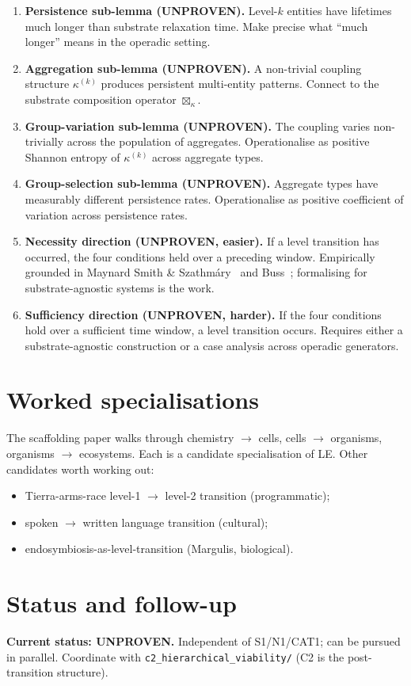 \documentclass[11pt]{article}
\theoremstyle{plain}
\theoremstyle{definition}
\begin{document}
\begin{enumerate}[leftmargin=2em,itemsep=4pt]
  \item \textbf{Persistence sub-lemma (UNPROVEN).} Level-$k$ entities
    have lifetimes much longer than substrate relaxation time. Make
    precise what ``much longer'' means in the operadic setting.
  \item \textbf{Aggregation sub-lemma (UNPROVEN).} A non-trivial
    coupling structure $\kappa^{(k)}$ produces persistent multi-entity
    patterns. Connect to the substrate composition operator
    $\boxtimes_\kappa$.
  \item \textbf{Group-variation sub-lemma (UNPROVEN).} The coupling
    varies non-trivially across the population of aggregates.
    Operationalise as positive Shannon entropy of $\kappa^{(k)}$
    across aggregate types.
  \item \textbf{Group-selection sub-lemma (UNPROVEN).} Aggregate
    types have measurably different persistence rates.
    Operationalise as positive coefficient of variation across
    persistence rates.
  \item \textbf{Necessity direction (UNPROVEN, easier).} If a level
    transition has occurred, the four conditions held over a
    preceding window. Empirically grounded in
    Maynard Smith \& Szathm\'ary~\cite{maynardsmith1995major} and
    Buss~\cite{buss1987evolution}; formalising for substrate-agnostic
    systems is the work.
  \item \textbf{Sufficiency direction (UNPROVEN, harder).} If the
    four conditions hold over a sufficient time window, a level
    transition occurs. Requires either a substrate-agnostic
    construction or a case analysis across operadic generators.
\end{enumerate}

\section{Worked specialisations}

The scaffolding paper walks through chemistry $\to$ cells, cells $\to$
organisms, organisms $\to$ ecosystems. Each is a candidate
specialisation of LE. Other candidates worth working out:

\begin{itemize}[leftmargin=1.5em,itemsep=2pt]
  \item Tierra-arms-race level-1 $\to$ level-2 transition (programmatic);
  \item spoken $\to$ written language transition (cultural);
  \item endosymbiosis-as-level-transition (Margulis, biological).
\end{itemize}

\section{Status and follow-up}

\textbf{Current status: UNPROVEN.} Independent of S1/N1/CAT1; can be
pursued in parallel. Coordinate with \texttt{c2\_hierarchical\_viability/}
(C2 is the post-transition structure).



\end{document}

